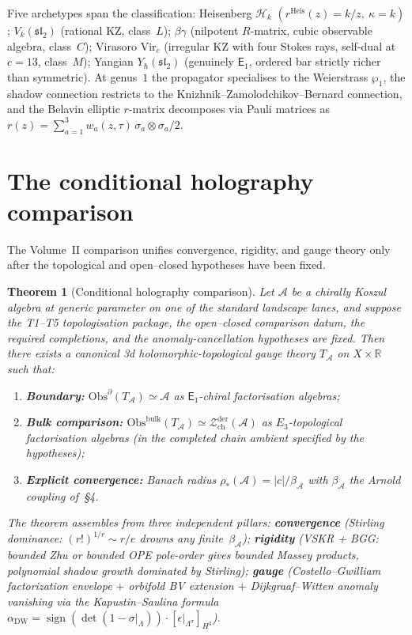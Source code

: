\documentclass[11pt]{article}
\providecommand{\cA}{\mathcal{A}}
\providecommand{\cH}{\mathcal{H}}
\providecommand{\cZ}{\mathcal{Z}}
\providecommand{\bR}{\mathbb{R}}
\providecommand{\Eone}{\mathsf{E}_{1}}
\newtheorem{theorem}{Theorem}[section]
\begin{document}
Five archetypes span the classification: Heisenberg $\cH_k$
$(r^{\mathrm{Heis}}(z) = k/z,\ \kappa = k)$;
$V_k(\mathfrak{sl}_2)$ (rational KZ, class~$L$);
$\beta\gamma$ (nilpotent $R$-matrix, cubic observable algebra,
class~$C$); Virasoro $\mathrm{Vir}_c$ (irregular KZ with four Stokes
rays, self-dual at $c=13$, class~$M$); Yangian
$Y_\hbar(\mathfrak{sl}_2)$ (genuinely $\Eone$, ordered bar strictly
richer than symmetric). At genus~$1$ the propagator specialises to
the Weierstrass $\wp_1$, the shadow connection restricts to the
Knizhnik--Zamolodchikov--Bernard connection, and the Belavin
elliptic $r$-matrix decomposes via Pauli matrices as
$r(z) = \sum_{a=1}^{3} w_a(z,\tau)\,\sigma_a\otimes\sigma_a/2$.

\section{The conditional holography comparison}

\noindent
The Volume~II comparison unifies convergence, rigidity, and gauge
theory only after the topological and open--closed hypotheses have been
fixed.

\begin{theorem}[Conditional holography comparison]
Let $\cA$ be a chirally Koszul algebra at generic parameter on one of
the standard landscape lanes, and suppose the T1--T5 topologisation
package, the open--closed comparison datum, the required completions,
and the anomaly-cancellation hypotheses are fixed. Then
there exists a canonical 3d holomorphic-topological gauge theory
$T_\cA$ on $X\times\bR$ such that:
\begin{enumerate}[label=\textup{(\roman*)},nosep]
\item \textbf{Boundary:}
$\mathrm{Obs}^{\partial}(T_\cA) \simeq \cA$ as
$\Eone$-chiral factorisation algebras;
\item \textbf{Bulk comparison:} $\mathrm{Obs}^{\mathrm{bulk}}(T_\cA) \simeq
\cZ^{\mathrm{der}}_{\mathrm{ch}}(\cA)$ as
$E_3$-topological factorisation algebras
\textup{(}in the completed chain ambient specified by the hypotheses\textup{)};
\item \textbf{Explicit convergence:} Banach radius
$\rho_*(\cA) = |c|/\beta_\cA$ with $\beta_\cA$ the Arnold
coupling of~\textup{\S4}.
\end{enumerate}
The theorem assembles from three independent pillars:
\textbf{convergence} \textup{(}Stirling dominance: $(r!)^{1/r}\sim r/e$
drowns any finite~$\beta_\cA$\textup{)};
\textbf{rigidity} \textup{(}VSKR + BGG: bounded Zhu or bounded OPE
pole-order gives bounded Massey products, polynomial shadow growth
dominated by Stirling\textup{)};
\textbf{gauge} \textup{(}Costello--Gwilliam factorization envelope
$+$ orbifold BV extension $+$ Dijkgraaf--Witten anomaly vanishing
via the Kapustin--Saulina formula
$\alpha_{\mathrm{DW}} = \operatorname{sign}(\det(1-\sigma|_\Lambda))
\cdot[\epsilon|_{\Lambda^\sigma}]_{H^3}$\textup{)}.
\end{theorem}
\end{document}
